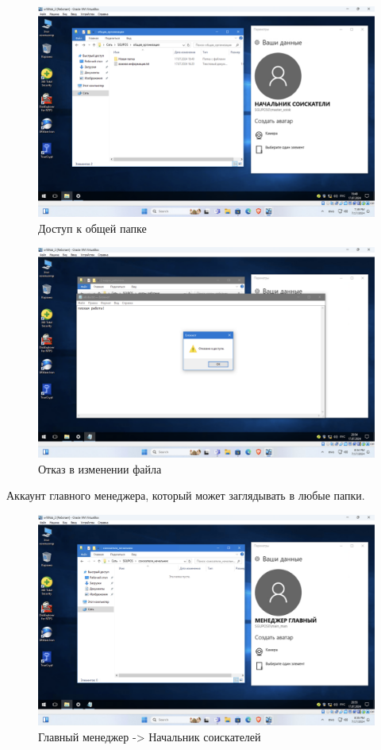 \begin{figure}[H]
  \centering
  \includegraphics[width=1\textwidth]{pict/prac/42}
  \caption{Доступ к общей папке}
  \label{fig:41}
\end{figure}

\begin{figure}[H]
  \centering
  \includegraphics[width=1\textwidth]{pict/prac/44}
  \caption{Отказ в изменении файла}
  \label{fig:43}
\end{figure}

Аккаунт главного менеджера, который может заглядывать в любые папки.
\begin{figure}[H]
  \centering
  \includegraphics[width=1\textwidth]{pict/prac/45}
  \caption{Главный менеджер -> Начальник соискателей}
  \label{fig:44}
\end{figure}

